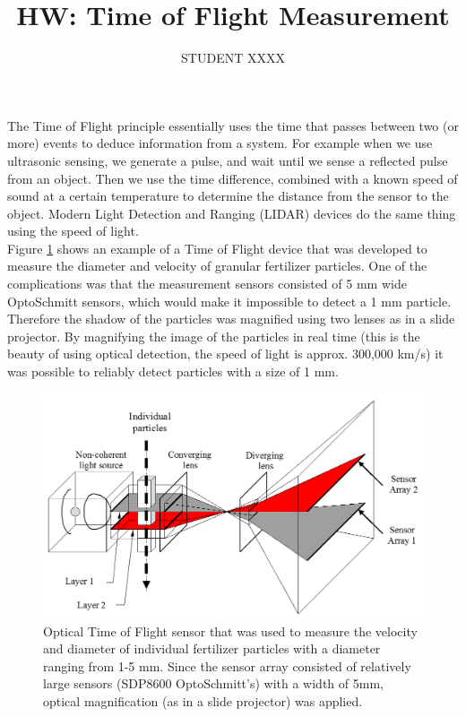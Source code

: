 \documentclass[11pt,letterpaper]{article}
\author{STUDENT XXXX}
\title{HW: Time of Flight Measurement}
\begin{document}
\maketitle

The Time of Flight principle essentially uses the time that passes between two (or more) events to deduce information from a system. For example when we use ultrasonic sensing, we generate a pulse, and wait until we sense a reflected pulse from an object. Then we use the time difference, combined with a known speed of sound at a certain temperature to determine the distance from the sensor to the object. Modern Light Detection and Ranging (LIDAR) devices do the same thing using the speed of light.\\ 

Figure \ref{fig:HW_TimeOfFlightMeasurement1} shows an example of a Time of Flight device that was developed to measure the diameter and velocity of granular fertilizer particles. One of the complications was that the measurement sensors consisted of 5 mm wide OptoSchmitt sensors, which would make it impossible to detect a 1 mm particle. Therefore the shadow of the particles was magnified using two lenses as in a slide projector. By magnifying the image of the particles in real time (this is the beauty of using optical detection, the speed of light is approx. 300,000 km/s) it was possible to reliably detect particles with a size of 1 mm.\\  

\begin{figure}
\centering
\includegraphics[width=0.65\linewidth]{HW_TimeOfFlightMeasurement1}
\caption{Optical Time of Flight sensor that was used to measure the velocity and diameter of individual fertilizer particles with a diameter ranging from 1-5 mm. Since the sensor array consisted of relatively large sensors (SDP8600 OptoSchmitt's) with a width of 5mm, optical magnification (as in a slide projector) was applied.}
\label{fig:HW_TimeOfFlightMeasurement1}
\end{figure}
\end{document}

